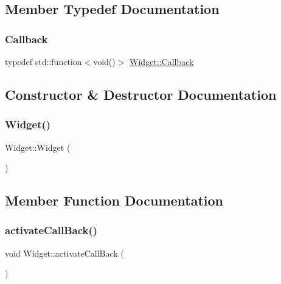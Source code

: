 \subsection{Member Typedef Documentation}
\mbox{\label{class_widget_af75970041184b1a72bceff618e142a09}} 
\subsubsection{\texorpdfstring{Callback}{Callback}}
{\footnotesize\ttfamily typedef std\+::function$<$void()$>$ \mbox{\hyperlink{class_widget_af75970041184b1a72bceff618e142a09}{Widget\+::\+Callback}}}



\subsection{Constructor \& Destructor Documentation}
\mbox{\label{class_widget_ab0f05949f1fa8ca233137fc4119c7401}} 
\subsubsection{\texorpdfstring{Widget()}{Widget()}}
{\footnotesize\ttfamily Widget\+::\+Widget (\begin{DoxyParamCaption}{ }\end{DoxyParamCaption})}



\subsection{Member Function Documentation}
\mbox{\label{class_widget_a9133f09cce2bcc645d23f36599c180f3}} 
\subsubsection{\texorpdfstring{activateCallBack()}{activateCallBack()}}
{\footnotesize\ttfamily void Widget\+::activate\+Call\+Back (\begin{DoxyParamCaption}{ }\end{DoxyParamCaption})}

